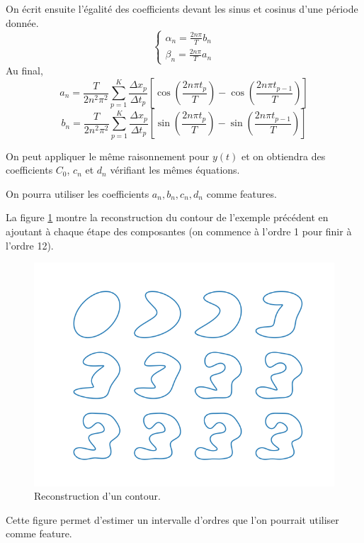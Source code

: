 On écrit ensuite l'égalité des coefficients devant les sinus et cosinus 
d'une période donnée.
\[
\begin{cases}
  \alpha_n = \frac{2n\pi}{T} b_n \\
  \beta_n = \frac{2n\pi}{T} a_n
\end{cases}
\]
Au final, 
\[
a_n = \frac{T}{2 n^2 \pi^2} \sum_{p = 1}^{K} \frac{\Delta x_p}{\Delta t_p} \left[ \cos\left(\frac{2n\pi t_p}{T}\right) - \cos\left(\frac{2n\pi t_{p-1}}{T}\right) \right]
\]
\[
b_n = \frac{T}{2 n^2 \pi^2} \sum_{p = 1}^{K} \frac{\Delta x_p}{\Delta t_p} \left[ \sin\left(\frac{2n\pi t_p}{T}\right) - \sin\left(\frac{2n\pi t_{p-1}}{T}\right) \right]
\]

On peut appliquer le même raisonnement pour $y(t)$ et on obtiendra des 
coefficients $C_0$, $c_n$ et $d_n$ vérifiant les mêmes équations.

On pourra utiliser les coefficients $a_n, b_n, c_n, d_n$ comme features.

La figure \ref{fig:contour-reconstruction} montre la reconstruction 
du contour de l'exemple précédent en ajoutant à chaque étape des 
composantes (on commence à l'ordre 1 pour finir à l'ordre 12). 

\begin{figure}[h!]
  \centering
  \includegraphics[scale=0.8]{assets/fourier-contour-image12-reconstruction}
  \caption{Reconstruction d'un contour.}
  \label{fig:contour-reconstruction}
\end{figure}

Cette figure permet d'estimer un intervalle d'ordres que l'on pourrait 
utiliser comme feature.



